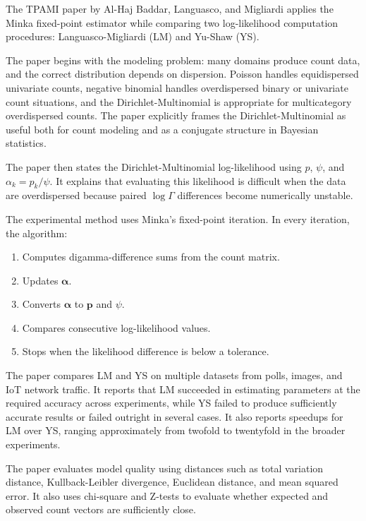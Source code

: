 \documentclass[11pt,a4paper]{article}
\begin{document}
The TPAMI paper by Al-Haj Baddar, Languasco, and Migliardi applies the Minka fixed-point estimator while comparing two log-likelihood computation procedures: Languasco-Migliardi (LM) and Yu-Shaw (YS).

The paper begins with the modeling problem: many domains produce count data, and the correct distribution depends on dispersion. Poisson handles equidispersed univariate counts, negative binomial handles overdispersed binary or univariate count situations, and the Dirichlet-Multinomial is appropriate for multicategory overdispersed counts. The paper explicitly frames the Dirichlet-Multinomial as useful both for count modeling and as a conjugate structure in Bayesian statistics.

The paper then states the Dirichlet-Multinomial log-likelihood using \(p\), \(\psi\), and \(\alpha_k=p_k/\psi\). It explains that evaluating this likelihood is difficult when the data are overdispersed because paired \(\log\Gamma\) differences become numerically unstable.

The experimental method uses Minka's fixed-point iteration. In every iteration, the algorithm:

\begin{enumerate}
  \item Computes digamma-difference sums from the count matrix.
  \item Updates \(\boldsymbol{\alpha}\).
  \item Converts \(\boldsymbol{\alpha}\) to \(\mathbf{p}\) and \(\psi\).
  \item Compares consecutive log-likelihood values.
  \item Stops when the likelihood difference is below a tolerance.
\end{enumerate}

The paper compares LM and YS on multiple datasets from polls, images, and IoT network traffic. It reports that LM succeeded in estimating parameters at the required accuracy across experiments, while YS failed to produce sufficiently accurate results or failed outright in several cases. It also reports speedups for LM over YS, ranging approximately from twofold to twentyfold in the broader experiments.

The paper evaluates model quality using distances such as total variation distance, Kullback-Leibler divergence, Euclidean distance, and mean squared error. It also uses chi-square and Z-tests to evaluate whether expected and observed count vectors are sufficiently close.
\end{document}
